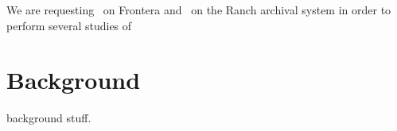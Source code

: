 
We are requesting \request\ on Frontera and \disk\ on the Ranch archival system in order to perform several studies of

\section{Background}

background stuff.
